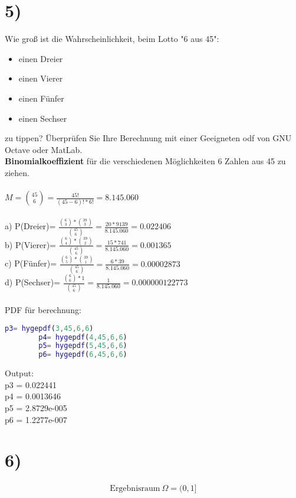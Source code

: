 \documentclass[11pt,a4paper]{article}
\begin{document}
	\section*{5)}
	Wie groß ist die Wahrscheinlichkeit, beim Lotto "6 aus 45":
	\begin{itemize}
		\item einen Dreier
		\item einen Vierer
		\item einen Fünfer
		\item einen Sechser
	\end{itemize}
	zu tippen? Überprüfen Sie Ihre Berechnung mit einer Geeigneten odf von GNU Octave oder MatLab.\\

	\textbf{Binomialkoeffizient} für die verschiedenen Möglichkeiten 6 Zahlen aus 45 zu ziehen.\\\\
	\(M=\binom{45}{6} =\frac{45!}{(45-6)! * 6!}= 8.145.060\)\\\\
	a) P(Dreier)= \( \frac{\binom{6}{3} * \binom{39}{3}}{\binom{45}{6}}=\frac{20*9139}{8.145.060}=0.022406\)\\
	b) P(Vierer)= \( \frac{\binom{6}{4} * \binom{39}{2}}{\binom{45}{6}}=\frac{15*741}{8.145.060}=0.001365\)\\
	c) P(Fünfer)= \( \frac{\binom{6}{5} * \binom{39}{1}}{\binom{45}{6}}=\frac{6*39}{8.145.060}=0.00002873\)\\
	d) P(Sechser)= \( \frac{\binom{6}{6} * 1}{\binom{45}{6}}=\frac{1}{8.145.060}=0.000000122773\)\\\\
	PDF für berechnung:\\
	\begin{lstlisting}[language=MatLab,frame=single]
		p3= hygepdf(3,45,6,6)
		p4= hygepdf(4,45,6,6)
		p5= hygepdf(5,45,6,6)
		p6= hygepdf(6,45,6,6)
	\end{lstlisting}
	Output:\\
	p3 =  0.022441\\
	p4 =  0.0013646\\
	p5 =   2.8729e-005\\
	p6 =   1.2277e-007\\

	\newpage
	\section*{6)}

  \begin{align*}
    \text{Ergebnisraum}\ \Omega = (0,1]
  \end{align*}
\end{document}

